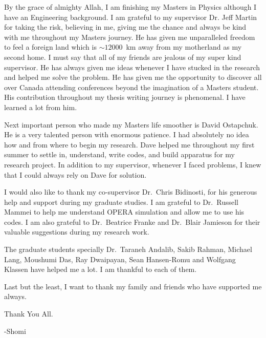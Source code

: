 \newpage
\tableofcontents
{}
\listoffigures
\listoftables

\begin{acknowledgments}
\vspace{2em}

By the grace of almighty Allah, I am finishing my Masters in Physics although I have an Engineering background. I am grateful to my supervisor Dr. Jeff Martin for taking the risk, believing in me, giving me the chance and always be kind with me throughout my Masters journey. He has given me unparalleled freedom to feel a foreign land which is $\sim12000$~km away from my motherland as my second home. I must say that all of my friends are jealous of my super kind supervisor. He has always given me ideas whenever I have stucked in the research and helped me solve the problem. He has given me the opportunity to discover all over Canada attending conferences beyond the imagination of a Masters student. His contribution throughout my thesis writing journey is phenomenal. I have learned a lot from him.

Next important person who made my Masters life smoother is David Ostapchuk. He is a very talented person with enormous patience. I had absolutely no idea how and from where to begin my research. Dave helped me throughout my first summer to settle in, understand, write codes, and build apparatus for my research project. In addition to my supervisor, whenever I faced problems, I knew that I could always rely on Dave for solution.

I would also like to thank my co-supervisor Dr.~Chris Bidinosti, for his generous help and support during my graduate studies. I am grateful to Dr.~Russell Mammei to help me understand OPERA simulation and allow me to use his codes. I am also grateful to Dr.~Beatrice Franke and Dr.~Blair Jamieson for their valuable suggestions during my research work. 

The graduate students specially Dr.~Taraneh Andalib, Sakib Rahman, Michael Lang, Moushumi Das, Ray Dwaipayan, Sean Hansen-Romu and Wolfgang Klassen have helped me a lot. I am thankful to each of them. 

Last but the least, I want to thank my family and friends who have supported me always. 

\vspace{2em}
Thank You All.

-Shomi

\end{acknowledgments}

